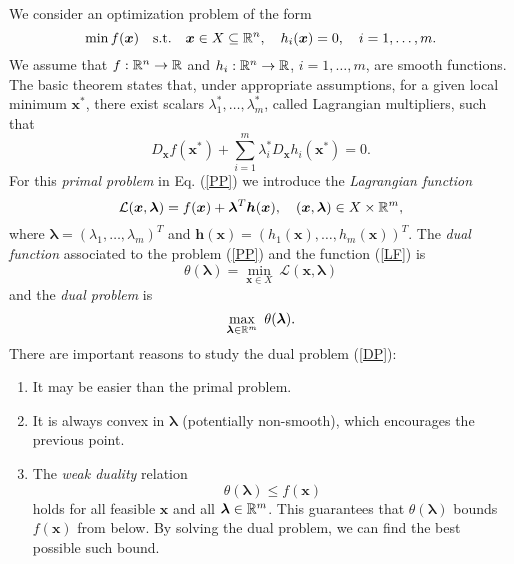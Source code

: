 We consider an optimization problem of the form
\begin{equation}
\min f(\bm{x})\quad\text{s.t.}\quad \bm{x}\in X\subseteq\mathbb{R}^n,\quad h_i(\bm{x})=0,\quad i=1,\dots,m.
\label{PP}
\end{equation}
We assume that $f:\mathbb{R}^n\to\mathbb{R}$ and $h_i:\mathbb{R}^n\to\mathbb{R}$, $i=1,\dots,m$, are smooth 
functions. The basic theorem states 
that, under appropriate assumptions, for a given local minimum $\bm{x}^*$, 
there exist scalars $\lambda_1^*,\dots,\lambda_m^*$, called Lagrangian 
multipliers, such that
\begin{equation*}
D_{\bm{x}}f(\bm{x}^*)+\sum_{i=1}^m\lambda_i^*D_{\bm{x}}h_i(\bm{x}^*)=0.
\end{equation*}
For this \textit{primal problem} in Eq. (\ref{PP}) we introduce the 
\textit{Lagrangian function}
\begin{equation}
\mathcal{L}(\bm{x},\bm{\lambda})=f(\bm{x})+\bm{\lambda}^T\bm{h}(\bm{x}),\quad(\bm{x},\bm{\lambda})\in X\times\mathbb{R}^m,
\label{LF}
\end{equation}
where $\bm{\lambda}=\left(\lambda_1,\dots,\lambda_m\right)^T$ and $\bm{h}(\bm{x})=\left(h_1(\bm{x}),\dots,h_m(\bm{x})\right)^T$. 
The \textit{dual function} associated to the problem (\ref{PP}) and the 
function (\ref{LF}) is
\begin{equation}
\theta(\bm{\lambda})=\min_{\bm{x}\in X}\ \mathcal{L}(\bm{x},\bm{\lambda})
\label{Dual_Function}
\end{equation}
and the \textit{dual problem} is
\begin{equation}
\max_{\bm{\lambda}\in\R^m}\ \theta(\bm{\lambda}).
\label{DP}
\end{equation}
There are important reasons to study the dual problem (\ref{DP}):
\begin{enumerate}

\item It may be easier than the primal problem.

\item It is always convex in $\bm{\lambda}$ (potentially non-smooth), which encourages the previous point.\label{Point_2}

\item The \textit{weak duality} relation
\begin{equation}
\theta(\bm{\lambda})\leq f(\bm{x})
\end{equation}
holds for all feasible $\bm{x}$ and all $\bm{\lambda}\in\mathbb{R}^m$. This 
guarantees that $\theta(\bm{\lambda})$ bounds $f(\bm{x})$ from below. 
By solving the dual problem, we can find the best possible such bound.

\end{enumerate}


